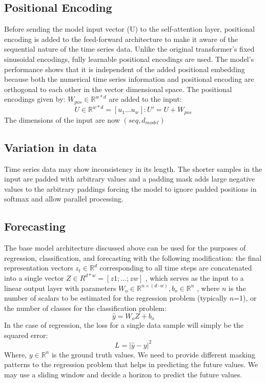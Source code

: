 \subsection{Positional Encoding}
Before sending the model input vector (U) to the self-attention layer, positional encoding is added to the feed-forward architecture to make it aware of the sequential nature of the time series data. Unlike the original transformer's fixed sinusoidal encodings, fully learnable positional encodings are used. The model’s performance shows that it is independent of the added positional embedding because both the numerical time series information and positional encoding are orthogonal to each other in the vector dimensional space. The positional encodings given by:         \(W_{pos} \in \mathbb{R}^{w*d}\) are added to the input:
\begin{equation}
    U \in \mathbb{R}^{w*d} = [u_1...u_w] : U' = U + W_{pos}
    \label{eq:positional-encoding}
\end{equation}
The dimensions of the input are now \((seq, d_{model})\)
\subsection{Variation in data} 
Time series data may show inconsistency in its length. The shorter samples in the input are padded with arbitrary values and a padding mask adds large negative values to the arbitrary paddings forcing the model to ignore padded positions in softmax and allow parallel processing.

\subsection{Forecasting}
The base model architecture discussed above can be used for the purposes of regression, classification, and forecasting with the following modification: the final representation vectors \(z_{t}\in \mathbb{R}^{d}\) corresponding to all time steps are concatenated into a single vector \(Z \in R^{d*w} = [z1;…;zw]\) , which serves as the input to a linear output layer with parameters \(W_{o} \in \mathbb{R}^{n×(d \cdot w)} , b_{o} \in \mathbb{R}^{n}\)  , where \(n\)  is the number of scalars to be estimated for the regression problem (typically  \(n\)=1), or the number of classes for the classification problem:
\begin{equation}
    \hat{y} =W_{o}Z+b_{o}
\end{equation}
In the case of regression, the loss for a single data sample will simply be the squared error: 
\begin{equation}
    L=|\hat{y}-y|^{2}
\end{equation} 
Where, \(y \in \mathbb{R}^n\)  is the ground truth values. We need to provide different masking patterns to the regression problem that helps in predicting the future values. We may use a sliding window and decide a horizon to predict the future values. 

